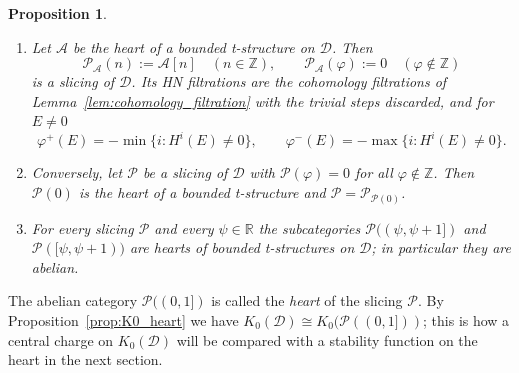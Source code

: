 \documentclass[12pt]{amsart}
\newtheorem{proposition}[theorem]{Proposition}
\numberwithin{theorem}{section}
\theoremstyle{definition}
\newcommand{\RR}{\mathbb{R}}
\newcommand{\ZZ}{\mathbb{Z}}
\newcommand{\calA}{\mathcal{A}}
\newcommand{\calP}{\mathcal{P}}
\newcommand{\Kgroup}{K_0}
\newcommand{\calD}{\mathcal{D}}
\begin{document}
	\begin{proposition}
		\label{prop:discrete_slicing}
		\begin{enumerate}
			\item Let $\calA$ be the heart of a bounded t-structure on $\calD$.
			Then
			\[
			\calP_{\calA}(n) := \calA[n] \quad (n \in \ZZ), \qquad \calP_{\calA}(\varphi) := 0 \quad (\varphi \notin \ZZ)
			\]
			is a slicing of $\calD$.
			Its HN filtrations are the cohomology filtrations of Lemma~\ref{lem:cohomology_filtration} with the trivial steps discarded, and for $E \neq 0$
			\[
			\varphi^+(E) = - \min \{ i : H^i(E) \neq 0 \}, \qquad \varphi^-(E) = - \max \{ i : H^i(E) \neq 0 \} .
			\]
			\item Conversely, let $\calP$ be a slicing of $\calD$ with $\calP(\varphi) = 0$ for all $\varphi \notin \ZZ$.
			Then $\calP(0)$ is the heart of a bounded t-structure and $\calP = \calP_{\calP(0)}$.
			\item For every slicing $\calP$ and every $\psi \in \RR$ the subcategories $\calP((\psi, \psi + 1])$ and $\calP([\psi, \psi + 1))$ are hearts of bounded t-structures on $\calD$;
			in particular they are abelian.
		\end{enumerate}
	\end{proposition}

	The abelian category $\calP((0, 1])$ is called the \emph{heart} of the slicing $\calP$.
	By Proposition~\ref{prop:K0_heart} we have $\Kgroup(\calD) \cong \Kgroup(\calP((0, 1]))$;
	this is how a central charge on $\Kgroup(\calD)$ will be compared with a stability function on the heart in the next section.
\end{document}
